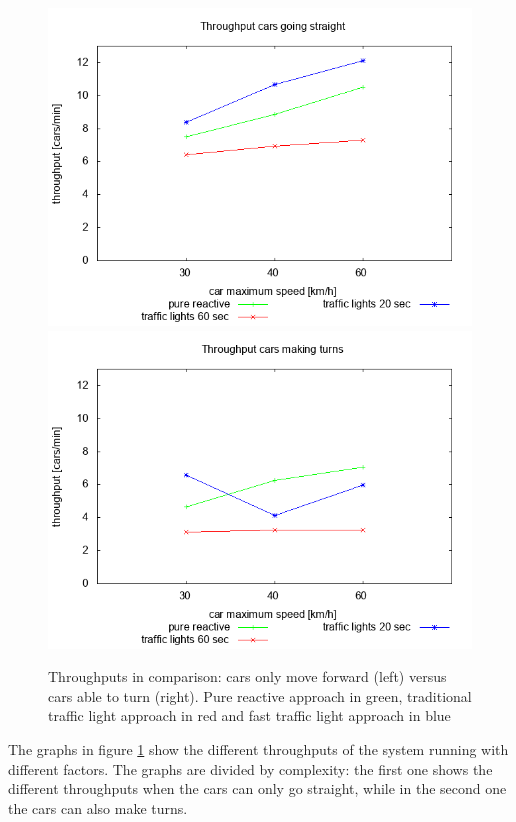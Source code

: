 \begin{figure}
\centering
\includegraphics[scale=0.35]{img/plot_throughstraight}
\includegraphics[scale=0.35]{img/plot_throughturns}
\caption{Throughputs in comparison: cars only move forward (left) versus cars able to turn (right). Pure reactive approach in green, traditional traffic light approach in red and fast traffic light approach in blue}
\label{fig:throughput}
\end{figure}

The graphs in figure \ref{fig:throughput} show the different throughputs of the system running with different factors.
The graphs are divided by complexity: the first one shows the different throughputs when the cars can only go straight, while in the second one the cars can also make turns.

